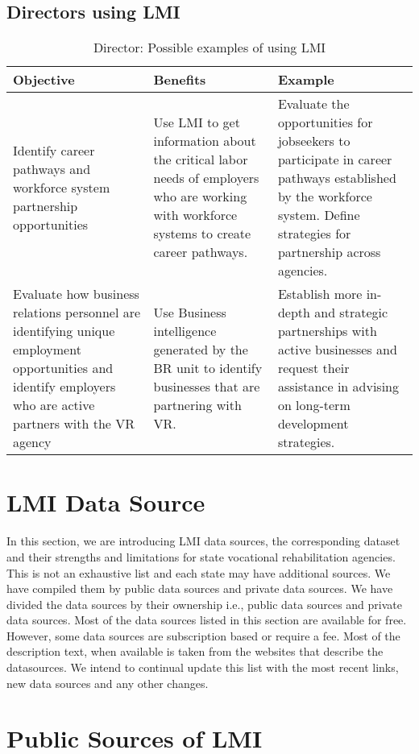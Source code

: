 \documentclass[]{book}
\theoremstyle{definition}
\theoremstyle{definition}
\theoremstyle{definition}
\theoremstyle{remark}
\begin{document}
\section{Directors using LMI}\label{directors-using-lmi}

\begin{longtable}[t]{lll}
\caption{\label{tab:unnamed-chunk-6}Director: Possible examples of using LMI}\\
\toprule
Objective & Benefits & Example\\
\midrule
Identify career pathways and workforce system partnership opportunities & Use LMI to get information about the critical labor needs of employers who are working with workforce systems to create career pathways. & Evaluate the opportunities for jobseekers to participate in career pathways established by the workforce system. Define strategies for partnership across agencies.\\
Evaluate how business relations personnel are identifying unique employment opportunities and identify employers who are active partners with the VR agency & Use Business intelligence generated by the BR unit to identify businesses that are partnering with VR. & Establish more in-depth and strategic partnerships with active businesses and request their assistance in advising on long-term development strategies.\\
\bottomrule
\end{longtable}

\chapter{LMI Data Source}\label{lmi-data-source}

In this section, we are introducing LMI data sources, the corresponding
dataset and their strengths and limitations for state vocational
rehabilitation agencies. This is not an exhaustive list and each state
may have additional sources. We have compiled them by public data
sources and private data sources. We have divided the data sources by
their ownership i.e., public data sources and private data sources. Most
of the data sources listed in this section are available for free.
However, some data sources are subscription based or require a fee. Most
of the description text, when available is taken from the websites that
describe the datasources. We intend to continual update this list with
the most recent links, new data sources and any other changes.

\chapter{Public Sources of LMI}\label{public-sources-of-lmi}
\end{document}
